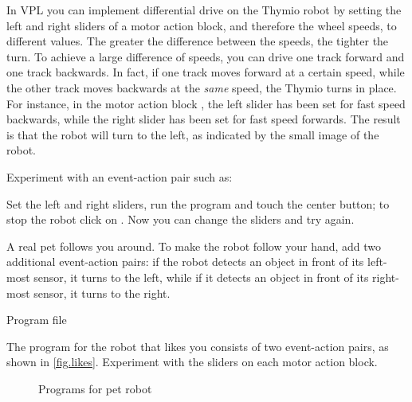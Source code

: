 In VPL you can implement differential drive on the Thymio robot by
setting the left and right sliders of a motor action block, and therefore the wheel speeds, to
different values.
The greater the difference between the speeds, the tighter the turn. To
achieve a large difference of speeds, you can drive one track forward
and one track backwards. In fact, if one track moves forward at a
certain speed, while the other track moves backwards at the \emph{same}
speed, the Thymio turns in place.
For instance, in the motor action block , the left slider has
been set for fast speed backwards, while the right slider has been set
for fast speed forwards.
The result is that the robot will turn to the left, as indicated by the small image of the robot.

Experiment with an event-action pair such as: 

Set the left and right sliders, run the program
and touch the center button; to stop the robot click on .
Now you can change the sliders and try again.




A real pet follows you around. To make the robot follow your hand, add
two additional event-action pairs: if the robot detects an object in
front of its left-most sensor, it turns to the left, while if it detects
an object in front of its right-most sensor, it turns to the right.

{\raggedleft \hfill Program file }

The program for the robot that likes you consists of two event-action pairs, as shown in \cref{fig.likes}.
Experiment with the sliders on each motor action block.

\begin{figure}
	\hfill
	\caption{Programs for pet robot}
\end{figure}


